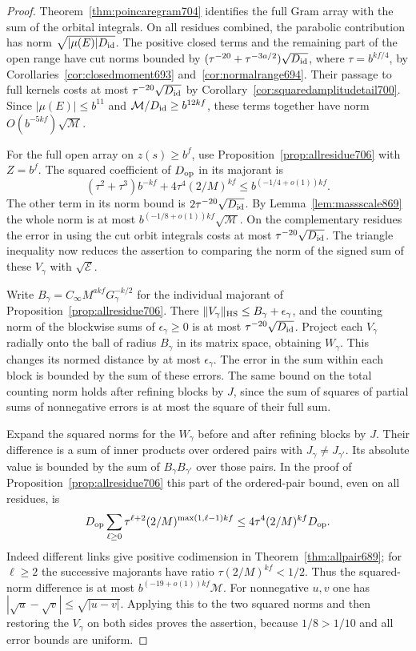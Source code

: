 \documentclass[a4paper,11pt]{article}
\theoremstyle{definition}
\theoremstyle{remark}
\numberwithin{equation}{section}
\begin{document}
\begin{proof}
Theorem~\ref{thm:poincaregram704} identifies the full Gram array
with the sum of the orbital integrals. On all residues combined,
the parabolic contribution has norm
\(\sqrt{|\mu(E)|D_{\rm id}}\). The positive closed terms and the
remaining part of the open range have cut norms bounded by
\((\tau^{-20}+\tau^{-3a/2})\sqrt{D_{\rm id}}\), where
\(\tau=b^{kf/4}\), by Corollaries~\ref{cor:closedmoment693}
and~\ref{cor:normalrange694}. Their passage to full kernels costs
at most \(\tau^{-20}\sqrt{D_{\rm id}}\) by
Corollary~\ref{cor:squaredamplitudetail700}. Since
\(|\mu(E)|\le b^{11}\) and \(\mathcal M/D_{\rm id}\ge b^{12kf}\),
these terms together have norm \(O(b^{-5kf})\sqrt{\mathcal M}\).

For the full open array on \(z(s)\ge b^f\), use
Proposition~\ref{prop:allresidue706} with \(Z=b^f\).
The squared coefficient of \(D_{\rm op}\) in its majorant is
\[
 (\tau^2+\tau^3)b^{-kf}+4\tau^4(2/M)^{kf}
          \le b^{(-1/4+o(1))kf}.
\]
The other term in its norm bound is
\(2\tau^{-20}\sqrt{D_{\rm id}}\). By Lemma~\ref{lem:massscale869}
the whole norm is at most
\(b^{(-1/8+o(1))kf}\sqrt{\mathcal M}\).
On the complementary residues the error in using the cut orbit
integrals costs at most \(\tau^{-20}\sqrt{D_{\rm id}}\).
The triangle inequality now reduces the assertion to comparing
the norm of the signed sum of these \(V_\gamma\) with
\(\sqrt{\mathcal E}\).

Write \(B_\gamma=C_\infty M^{akf}G_\gamma^{-k/2}\) for the
individual majorant of Proposition~\ref{prop:allresidue706}.
There \(\|V_\gamma\|_{\rm HS}\le B_\gamma+\epsilon_\gamma\),
and the counting norm of the blockwise sums of
\(\epsilon_\gamma\ge0\) is at most
\(\tau^{-20}\sqrt{D_{\rm id}}\).
Project each \(V_\gamma\) radially onto the ball of radius
\(B_\gamma\) in its matrix space, obtaining \(W_\gamma\).
This changes its normed distance by at most \(\epsilon_\gamma\).
The error in the sum within each block is bounded by the sum of
these errors. The same bound on the total counting norm holds
after refining blocks by \(J\), since the sum of squares of
partial sums of nonnegative errors is at most the square of
their full sum.

Expand the squared norms for the \(W_\gamma\) before and after
refining blocks by \(J\). Their difference is a sum of inner
products over ordered pairs with \(J_\gamma\ne J_{\gamma'}\).
Its absolute value is bounded by the sum of
\(B_\gamma B_{\gamma'}\) over those pairs.
In the proof of Proposition~\ref{prop:allresidue706} this part
of the ordered-pair bound, even on all residues, is
\[
 D_{\rm op}\sum_{\ell\ge0}\tau^{\ell+2}
               (2/M)^{\max(1,\ell-1)kf}
 \le 4\tau^4(2/M)^{kf}D_{\rm op}.
\]
Indeed different links give positive codimension in
Theorem~\ref{thm:allpair689}; for \(\ell\ge2\) the successive
majorants have ratio \(\tau(2/M)^{kf}<1/2\).
Thus the squared-norm difference is at most
\(b^{(-19+o(1))kf}\mathcal M\).
For nonnegative \(u,v\) one has
\(|\sqrt u-\sqrt v|\le\sqrt{|u-v|}\).
Applying this to the two squared norms and then restoring the
\(V_\gamma\) on both sides proves the assertion, because
\(1/8>1/10\) and all error bounds are uniform.


\end{proof}
\end{document}
